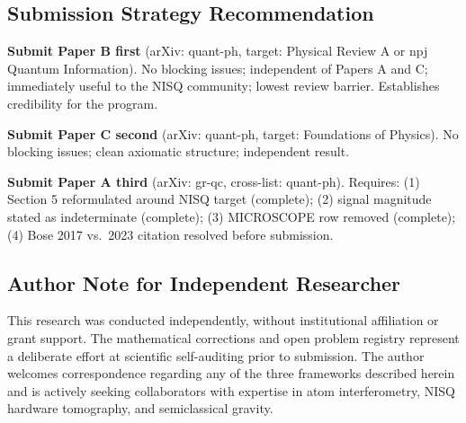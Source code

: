 \documentclass[12pt,letterpaper]{article}
\theoremstyle{plain}
\theoremstyle{definition}
\theoremstyle{remark}
\begin{document}
\subsection*{Submission Strategy Recommendation}

\textbf{Submit Paper B first} (arXiv: quant-ph, target: Physical
Review A or npj Quantum Information). No blocking issues; independent
of Papers A and C; immediately useful to the NISQ community; lowest
review barrier. Establishes credibility for the program.

\textbf{Submit Paper C second} (arXiv: quant-ph, target: Foundations
of Physics). No blocking issues; clean axiomatic structure; independent
result.

\textbf{Submit Paper A third} (arXiv: gr-qc, cross-list: quant-ph).
Requires: (1) Section 5 reformulated around NISQ target (complete);
(2) signal magnitude stated as indeterminate (complete); (3) MICROSCOPE
row removed (complete); (4) Bose 2017 vs.\ 2023 citation resolved before
submission.

\subsection*{Author Note for Independent Researcher}

This research was conducted independently, without institutional
affiliation or grant support. The mathematical corrections and open
problem registry represent a deliberate effort at scientific
self-auditing prior to submission. The author welcomes correspondence
regarding any of the three frameworks described herein and is actively
seeking collaborators with expertise in atom interferometry,
NISQ hardware tomography, and semiclassical gravity.
\end{document}
